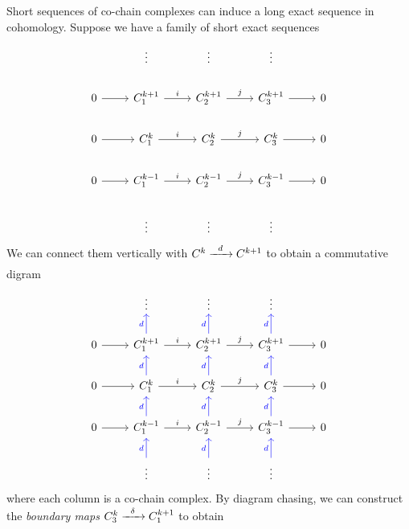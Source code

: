 Short sequences of co-chain complexes can induce a long exact sequence in cohomology. Suppose we have a family of short exact sequences \[
    \begin{tikzcd}
         & \vdots & \vdots & \vdots &  \\
        0 \ar{r} & C_1^{k+1} \ar{r}{i} & C_2^{k+1} \ar{r}{j} & C_3^{k+1} \ar{r} & 0 \\
        0 \ar{r} & C_1^k \ar{r}{i} & C_2^k \ar{r}{j} & C_3^k \ar{r} & 0 \\
        0 \ar{r} & C_1^{k-1} \ar{r}{i} & C_2^{k-1} \ar{r}{j} & C_3^{k-1} \ar{r} & 0 \\
         & \vdots & \vdots & \vdots & 
    \end{tikzcd}
\]
We can connect them vertically with \(C^k\xrightarrow[\hspace{1.5em}]{d} C^{k+1}\) to obtain a commutative digram \[
    \begin{tikzcd}
         & \vdots & \vdots & \vdots & \\
        0 \ar{r} & C_1^{k+1} \ar{r}{i} \ar[blue]{u}{d} & C_2^{k+1} \ar{r}{j} \ar[blue]{u}{d} & C_3^{k+1} \ar{r} \ar[blue]{u}{d} & 0 \\
        0 \ar{r} & C_1^k \ar{r}{i} \ar[blue]{u}{d} & C_2^k \ar{r}{j} \ar[blue]{u}{d} & C_3^k \ar{r} \ar[blue]{u}{d} & 0 \\
        0 \ar{r} & C_1^{k-1} \ar{r}{i} \ar[blue]{u}{d} & C_2^{k-1} \ar{r}{j} \ar[blue]{u}{d} & C_3^{k-1} \ar{r} \ar[blue]{u}{d} & 0 \\
        & \vdots \ar[blue]{u}{d} & \vdots \ar[blue]{u}{d} & \vdots \ar[blue]{u}{d} &
    \end{tikzcd}
\] where each column is a co-chain complex. By diagram chasing, we can construct the \emph{boundary maps} \(C_3^k\xrightarrow[\hspace{1.5em}]{\delta} C_1^{k+1}\) to obtain



